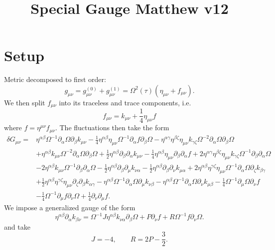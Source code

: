 \documentclass[10pt,letterpaper]{article}
\title{Special Gauge Matthew v12}
\date{}
\begin{document}
\maketitle
\section*{Setup}
Metric decomposed to first order:
\begin{equation}
g_{\mu\nu} = g^{(0)}_{\mu\nu} + g^{(1)}_{\mu\nu} = \Omega^2(\tau)(\eta_{\mu\nu}+f_{\mu\nu}).
\end{equation}
We then split $f_{\mu\nu}$ into its traceless and trace components, i.e.
\begin{equation}
	f_{\mu\nu} = k_{\mu\nu} + \frac 14 \eta_{\mu\nu}f
\end{equation}
where $f = \eta^{\mu\nu}f_{\mu\nu}$. The fluctuations then take the form
\begin{align}
\delta G_{\mu\nu}={}&\eta^{\alpha \beta} \Omega^{-1} \partial_{\alpha}\Omega \partial_{\beta}k_{\mu \nu}
 -  \tfrac{1}{4} \eta^{\alpha \beta} \eta_{\mu \nu} \Omega^{-1} \partial_{\alpha}f \partial_{\beta}\Omega
 -  \eta^{\alpha \gamma} \eta^{\beta \zeta} \eta_{\mu \nu} k_{\gamma \zeta} \Omega^{-2} \partial_{\alpha}\Omega \partial_{\beta}\Omega\nonumber\\
& + \eta^{\alpha \beta} k_{\mu \nu} \Omega^{-2} \partial_{\alpha}\Omega \partial_{\beta}\Omega
 + \tfrac{1}{2} \eta^{\alpha \beta} \partial_{\beta}\partial_{\alpha}k_{\mu \nu}
 -  \tfrac{1}{4} \eta^{\alpha \beta} \eta_{\mu \nu} \partial_{\beta}\partial_{\alpha}f
 + 2 \eta^{\alpha \gamma} \eta^{\beta \zeta} \eta_{\mu \nu} k_{\gamma \zeta} \Omega^{-1} \partial_{\beta}\partial_{\alpha}\Omega\nonumber\\
& - 2 \eta^{\alpha \beta} k_{\mu \nu} \Omega^{-1} \partial_{\beta}\partial_{\alpha}\Omega
 -  \tfrac{1}{2} \eta^{\alpha \beta} \partial_{\beta}\partial_{\mu}k_{\nu \alpha}
 -  \tfrac{1}{2} \eta^{\alpha \beta} \partial_{\beta}\partial_{\nu}k_{\mu \alpha}
 + 2 \eta^{\alpha \beta} \eta^{\gamma \zeta} \eta_{\mu \nu} \Omega^{-1} \partial_{\alpha}\Omega \partial_{\zeta}k_{\beta \gamma}\nonumber\\
& + \tfrac{1}{2} \eta^{\alpha \beta} \eta^{\gamma \zeta} \eta_{\mu \nu} \partial_{\zeta}\partial_{\beta}k_{\alpha \gamma}
 -  \eta^{\alpha \beta} \Omega^{-1} \partial_{\alpha}\Omega \partial_{\mu}k_{\nu \beta}
 -  \eta^{\alpha \beta} \Omega^{-1} \partial_{\alpha}\Omega \partial_{\nu}k_{\mu \beta}
 -  \tfrac{1}{4} \Omega^{-1} \partial_{\mu}\Omega \partial_{\nu}f\nonumber\\
& -  \tfrac{1}{4} \Omega^{-1} \partial_{\mu}f \partial_{\nu}\Omega
 + \tfrac{1}{4} \partial_{\nu}\partial_{\mu}f.
\end{align}
We impose a generalized gauge of the form
\begin{equation}
	\eta^{\alpha\beta}\partial_{\alpha}k_{\beta\nu} = \Omega^{-1} J \eta^{\alpha\beta}k_{\nu\alpha}\partial_\beta \Omega + P \partial_\nu f + R \Omega^{-1} f \partial_\nu \Omega.
\end{equation}
 and take
\begin{equation}
	J=-4,\qquad R = 2P-\frac32.
\end{equation}
\\
\end{document}
